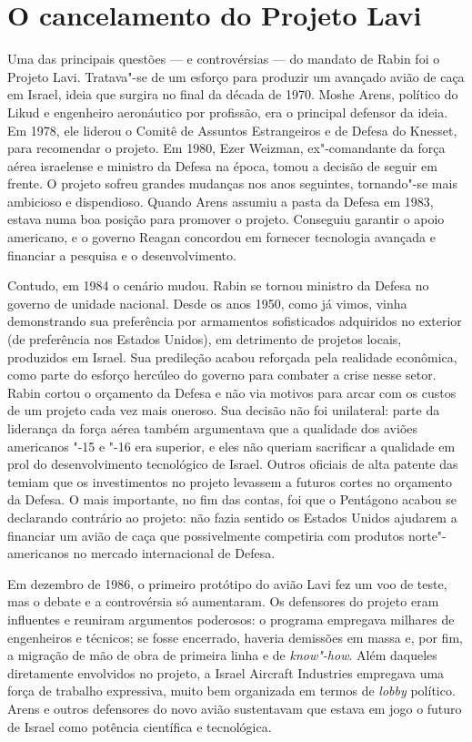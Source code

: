 \section{O cancelamento do Projeto Lavi}

Uma das principais questões --- e controvérsias --- do mandato de Rabin
foi o Projeto Lavi. Tratava"-se de um esforço para produzir um avançado
avião de caça em Israel, ideia que surgira no final da década de 1970.
Moshe Arens, político do Likud e engenheiro aeronáutico por profissão,
era o principal defensor da ideia. Em 1978, ele liderou o Comitê de
Assuntos Estrangeiros e de Defesa do Knesset, para recomendar o projeto.
Em 1980, Ezer Weizman, ex"-comandante da força aérea israelense e
ministro da Defesa na época, tomou a decisão de seguir em frente. O
projeto sofreu grandes mudanças nos anos seguintes, tornando"-se mais
ambicioso e dispendioso. Quando Arens assumiu a pasta da Defesa em 1983,
estava numa boa posição para promover o projeto. Conseguiu garantir o
apoio americano, e o governo Reagan concordou em fornecer tecnologia
avançada e financiar a pesquisa e o desenvolvimento.

Contudo, em 1984 o cenário mudou. Rabin se tornou ministro da Defesa no
governo de unidade nacional. Desde os anos 1950, como já vimos, vinha
demonstrando sua preferência por armamentos sofisticados adquiridos no
exterior (de preferência nos Estados Unidos), em detrimento de projetos
locais, produzidos em Israel. Sua predileção acabou reforçada pela
realidade econômica, como parte do esforço hercúleo do governo para
combater a crise nesse setor. Rabin cortou o orçamento da Defesa e não
via motivos para arcar com os custos de um projeto cada vez mais
oneroso. Sua decisão não foi unilateral: parte da liderança da força
aérea também argumentava que a qualidade dos aviões americanos "-15 e
"-16 era superior, e eles não queriam sacrificar a qualidade em prol do
desenvolvimento tecnológico de Israel. Outros oficiais de alta patente
das  temiam que os investimentos no projeto levassem a futuros cortes
no orçamento da Defesa. O mais importante, no fim das contas, foi que o
Pentágono acabou se declarando contrário ao projeto: não fazia sentido
os Estados Unidos ajudarem a financiar um avião de caça que
possivelmente competiria com produtos norte"-americanos no mercado
internacional de Defesa.

Em dezembro de 1986, o primeiro protótipo do avião Lavi fez um voo de
teste, mas o debate e a controvérsia só aumentaram. Os defensores do
projeto eram influentes e reuniram argumentos poderosos: o programa
empregava milhares de engenheiros e técnicos; se fosse encerrado,
haveria demissões em massa e, por fim, a migração de mão de obra de
primeira linha e de \emph{know"-how}. Além daqueles diretamente envolvidos no
projeto, a Israel Aircraft Industries empregava uma força de trabalho
expressiva, muito bem organizada em termos de \emph{lobby} político. Arens e
outros defensores do novo avião sustentavam que estava em jogo o futuro
de Israel como potência científica e tecnológica.

